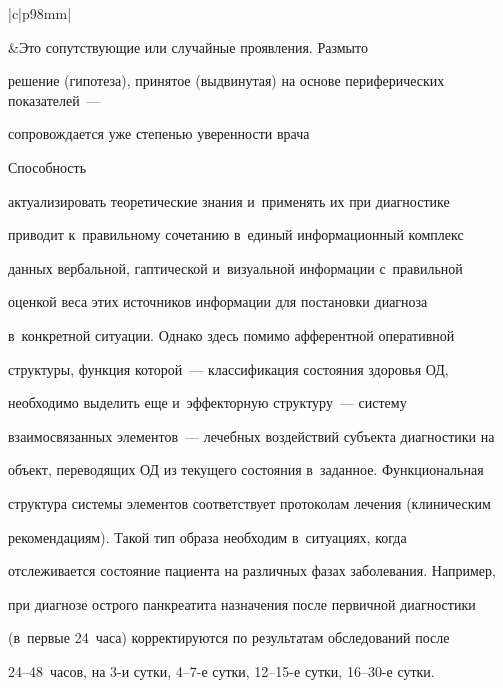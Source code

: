 \begin{itemize}
\begin{table}
\begin{center}
\begin{tabular}{|c|p{98mm}|}
\hline

&Это сопутствующие или случайные проявления. Размыто 

решение (гипотеза), принятое (выдвинутая) на основе периферических показателей~--- 

сопровождается уже степенью уверенности врача\\

\hline

\end{tabular}

\end{center}

\end{table}

 Способность 

актуализировать теоретические знания и~применять их при диагностике 

приводит к~правильному сочетанию в~единый информационный комплекс 

данных вербальной, гаптической и~визуальной информации с~правильной 

оценкой веса этих источников информации для постановки диагноза 

в~конкретной ситуации. Однако здесь помимо афферентной оперативной 

структуры, функция которой~--- классификация состояния здоровья ОД, 

необходимо выделить еще и~эффекторную структуру~--- систему 

взаимосвязанных элементов~--- лечебных воздействий субъекта диагностики на 

объект, переводящих ОД из текущего состояния в~заданное. Функциональная 

структура системы элементов соответствует протоколам лечения (клиническим 

рекомендациям). Такой тип образа необходим в~ситуациях, когда 

отслеживается состояние пациента на различных фазах заболевания. Например, 

при диагнозе острого панкреатита назначения после первичной диагностики 

(в~первые 24~часа) корректируются по результатам обследований после  

24--48~часов, на 3-и сутки, 4--7-е сутки, 12--15-е сутки, 16--30-е сутки.

\end{itemize}




